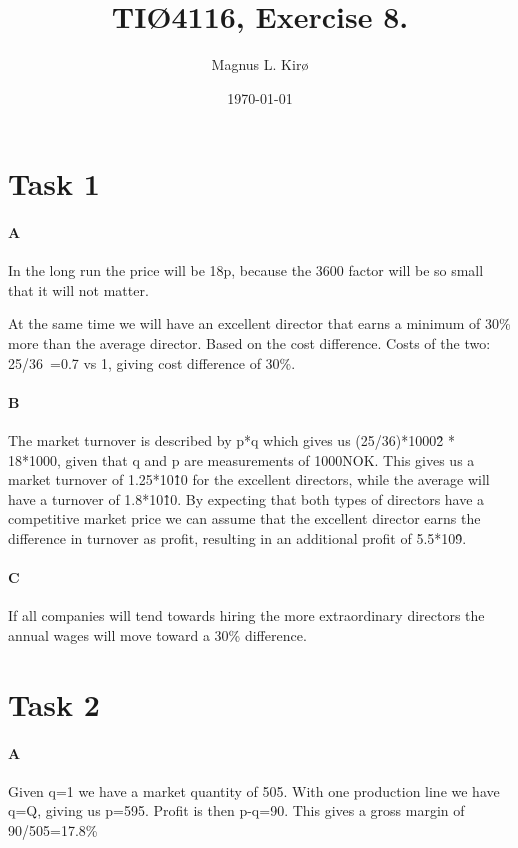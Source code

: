 \documentclass[12pt, a4paper]{article}
\title{
	TIØ4116, Exercise 8. 
}
\author{
	Magnus L. Kirø \\
}
\date{\today}
\begin{document}
\maketitle
{}

\section{Task 1}

\paragraph{A}
In the long run the price will be 18p, because the 3600 factor will be so small
that it will not matter. 

At the same time we will have an excellent director that earns a minimum of 30\% more than
the average director. Based on the cost difference. Costs of the two: 25/36~=0.7
vs 1, giving cost difference of 30\%. 

\paragraph{B}
The market turnover is described by p*q which gives us (25/36)*1000\^2 *
18*1000, given that q and p are measurements of 1000NOK. This gives us a market
turnover of 1.25*10\^10 for the excellent directors, while the average will have
a turnover of 1.8*10\^10. By expecting that both types of directors have a
competitive market price we can assume that the excellent director earns the
difference in turnover as profit, resulting in an additional profit of
5.5*10\^9. 

\paragraph{C}
If all companies will tend towards hiring the more extraordinary directors the
annual wages will move toward a 30\% difference. 


\section{Task 2}
\paragraph{A}
Given q=1 we have a market quantity of 505. With one production line we have
q=Q, giving us p=595. Profit is then p-q=90. This gives a gross margin of
90/505=17.8\%
\end{document}
